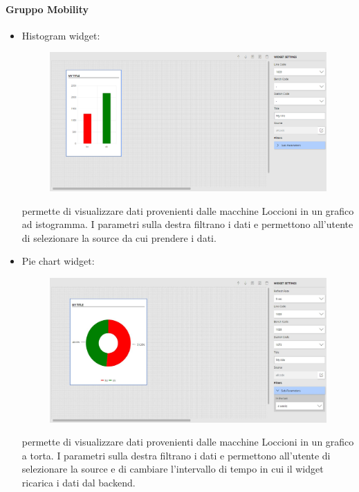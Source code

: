 \paragraph{Gruppo Mobility}
\begin{itemize}
    \item Histogram widget: 
    
\begin{figure}[ht]
\centering
\includegraphics[scale=0.265]{Images/Histogram.png}
\end{figure}
permette di visualizzare dati provenienti dalle macchine Loccioni in un grafico ad istogramma. I parametri sulla destra filtrano i dati e permettono all'utente di selezionare la source da cui prendere i dati.
\end{itemize}
\pagebreak
\begin{itemize}
    \item Pie chart widget: 
    
\begin{figure}[ht]
\centering
\includegraphics[scale=0.32]{Images/Piechart.JPG}
\end{figure}
permette di visualizzare dati provenienti dalle macchine Loccioni in un grafico a torta. I parametri sulla destra filtrano i dati e permettono all'utente di selezionare la source e di cambiare l'intervallo di tempo in cui il widget ricarica i dati dal backend.
\end{itemize}
